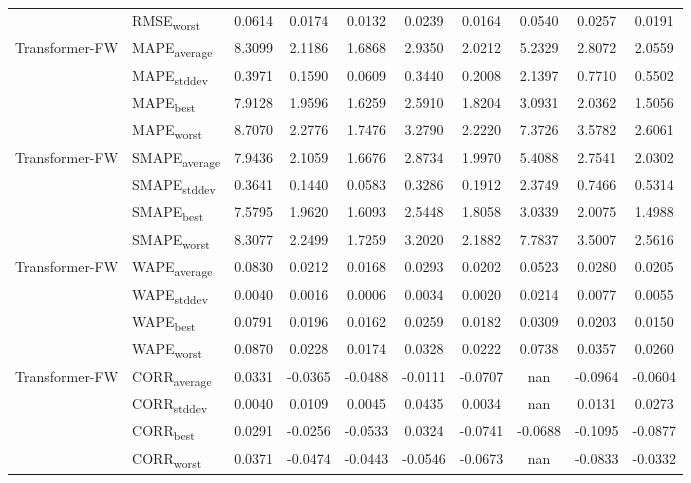 {\begin{longtable}{l l c c c c c c c c}
 & RMSE\textsubscript{worst} & 0.0614 & 0.0174 & 0.0132 & 0.0239 & 0.0164 & 0.0540 & 0.0257 & 0.0191 \\
\cmidrule(lr){2-10}
\multirow{4}{*}{Transformer-FW} & MAPE\textsubscript{average} & 8.3099 & 2.1186 & 1.6868 & 2.9350 & 2.0212 & 5.2329 & 2.8072 & 2.0559 \\
 & MAPE\textsubscript{stddev} & 0.3971 & 0.1590 & 0.0609 & 0.3440 & 0.2008 & 2.1397 & 0.7710 & 0.5502 \\
 & MAPE\textsubscript{best} & 7.9128 & 1.9596 & 1.6259 & 2.5910 & 1.8204 & 3.0931 & 2.0362 & 1.5056 \\
 & MAPE\textsubscript{worst} & 8.7070 & 2.2776 & 1.7476 & 3.2790 & 2.2220 & 7.3726 & 3.5782 & 2.6061 \\
\cmidrule(lr){2-10}
\multirow{4}{*}{Transformer-FW} & SMAPE\textsubscript{average} & 7.9436 & 2.1059 & 1.6676 & 2.8734 & 1.9970 & 5.4088 & 2.7541 & 2.0302 \\
 & SMAPE\textsubscript{stddev} & 0.3641 & 0.1440 & 0.0583 & 0.3286 & 0.1912 & 2.3749 & 0.7466 & 0.5314 \\
 & SMAPE\textsubscript{best} & 7.5795 & 1.9620 & 1.6093 & 2.5448 & 1.8058 & 3.0339 & 2.0075 & 1.4988 \\
 & SMAPE\textsubscript{worst} & 8.3077 & 2.2499 & 1.7259 & 3.2020 & 2.1882 & 7.7837 & 3.5007 & 2.5616 \\
\cmidrule(lr){2-10}
\multirow{4}{*}{Transformer-FW} & WAPE\textsubscript{average} & 0.0830 & 0.0212 & 0.0168 & 0.0293 & 0.0202 & 0.0523 & 0.0280 & 0.0205 \\
 & WAPE\textsubscript{stddev} & 0.0040 & 0.0016 & 0.0006 & 0.0034 & 0.0020 & 0.0214 & 0.0077 & 0.0055 \\
 & WAPE\textsubscript{best} & 0.0791 & 0.0196 & 0.0162 & 0.0259 & 0.0182 & 0.0309 & 0.0203 & 0.0150 \\
 & WAPE\textsubscript{worst} & 0.0870 & 0.0228 & 0.0174 & 0.0328 & 0.0222 & 0.0738 & 0.0357 & 0.0260 \\
\cmidrule(lr){2-10}
\multirow{4}{*}{Transformer-FW} & CORR\textsubscript{average} & 0.0331 & -0.0365 & -0.0488 & -0.0111 & -0.0707 & nan & -0.0964 & -0.0604 \\
 & CORR\textsubscript{stddev} & 0.0040 & 0.0109 & 0.0045 & 0.0435 & 0.0034 & nan & 0.0131 & 0.0273 \\
 & CORR\textsubscript{best} & 0.0291 & -0.0256 & -0.0533 & 0.0324 & -0.0741 & -0.0688 & -0.1095 & -0.0877 \\
 & CORR\textsubscript{worst} & 0.0371 & -0.0474 & -0.0443 & -0.0546 & -0.0673 & nan & -0.0833 & -0.0332 \\

\end{longtable}}
